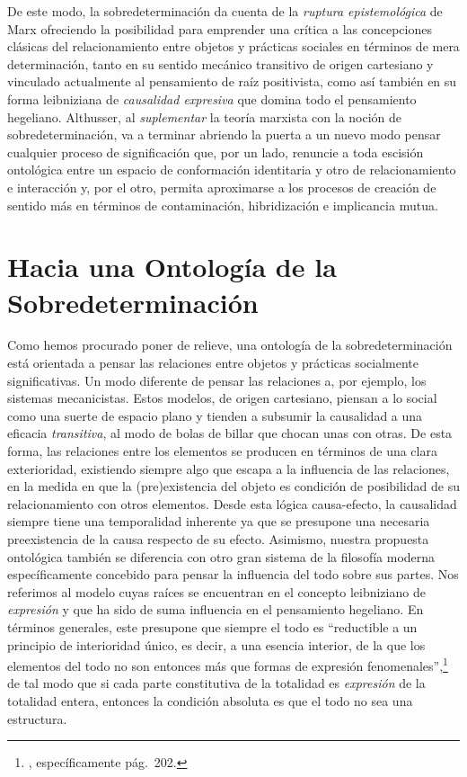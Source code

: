 De este modo, la sobredeterminación da cuenta de la \emph{ruptura epistemológica} de Marx ofreciendo la posibilidad para emprender una crítica a las concepciones clásicas del relacionamiento entre objetos y prácticas sociales en términos de mera determinación, tanto en su sentido mecánico transitivo de origen cartesiano y vinculado actualmente al pensamiento de raíz positivista, como así también en su forma leibniziana de \emph{causalidad expresiva} que domina todo el pensamiento hegeliano. Althusser, al \emph{suplementar} la teoría marxista con la noción de sobredeterminación, va a terminar abriendo la puerta a un nuevo modo pensar cualquier proceso de significación que, por un lado, renuncie a toda escisión ontológica entre un espacio de conformación identitaria y otro de relacionamiento e interacción y, por el otro, permita aproximarse a los procesos de creación de sentido más en términos de contaminación, hibridización e implicancia mutua.


\section{Hacia una Ontología de la Sobredeterminación}

Como hemos procurado poner de relieve, una ontología de la sobredeterminación está orientada a pensar las relaciones entre objetos y prácticas socialmente significativas. Un modo diferente de pensar las relaciones a, por ejemplo, los sistemas mecanicistas. Estos modelos, de origen cartesiano, piensan a lo social como una suerte de espacio plano y tienden a subsumir la causalidad a una eficacia \emph{transitiva}, al modo de bolas de billar que chocan unas con otras. De esta forma, las relaciones entre los elementos se producen en términos de una clara exterioridad, existiendo siempre algo que escapa a la influencia de las relaciones, en la medida en que la (pre)existencia del objeto es condición de posibilidad de su relacionamiento con otros elementos. Desde esta lógica causa-efecto, la causalidad siempre tiene una temporalidad inherente ya que se presupone una necesaria  preexistencia de la causa respecto de su efecto. Asimismo, nuestra propuesta ontológica también se diferencia con otro gran sistema de la filosofía moderna específicamente concebido para pensar la influencia del todo sobre sus partes. Nos referimos al modelo cuyas raíces se encuentran en el concepto leibniziano de \emph{expresión} y que ha sido de suma influencia en el pensamiento hegeliano. En términos generales, este presupone que siempre el todo es \enquote{reductible a un principio de interioridad único, es decir, a una esencia interior, de la que los elementos del todo no son entonces más que formas de expresión fenomenales},\footnote{\cite[][197-209]{@7035-ALTHUSSER1967}, específicamente pág.~202.} de tal modo que si cada parte constitutiva de la totalidad es \emph{expresión} de la totalidad entera, entonces la condición absoluta es que el todo no sea una estructura.

